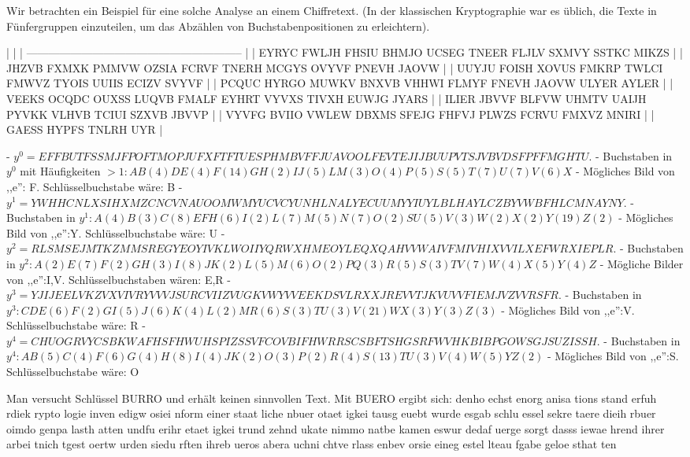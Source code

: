\documentclass[a4paper]{article}
\begin{document}
\begin{multicols}{3}
Wir betrachten ein Beispiel für eine solche Analyse an einem Chiffretext. (In der klassischen Kryptographie war es üblich, die Texte in Fünfergruppen einzuteilen, um das Abzählen von Buchstabenpositionen zu erleichtern).

|                                                             |
| ----------------------------------------------------------- |
| EYRYC FWLJH FHSIU BHMJO UCSEG TNEER FLJLV SXMVY SSTKC MIKZS |
| JHZVB FXMXK PMMVW OZSIA FCRVF TNERH MCGYS OVYVF PNEVH JAOVW |
| UUYJU FOISH XOVUS FMKRP TWLCI FMWVZ TYOIS UUIIS ECIZV SVYVF |
| PCQUC HYRGO MUWKV BNXVB VHHWI FLMYF FNEVH JAOVW ULYER AYLER |
| VEEKS OCQDC OUXSS LUQVB FMALF EYHRT VYVXS TIVXH EUWJG JYARS |
| ILIER JBVVF BLFVW UHMTV UAIJH PYVKK VLHVB TCIUI SZXVB JBVVP |
| VYVFG BVIIO VWLEW DBXMS SFEJG FHFVJ PLWZS FCRVU FMXVZ MNIRI |
| GAESS HYPFS TNLRH UYR                                       |

- $y^0 =EFFBUTFSSMJFPOFTMOPJUFXFTFTUESPHMBVFFJUAVOOLFEVTEJIJBUUPVTSJVBVDSFPFFMGHTU$. 
  - Buchstaben in $y^0$ mit Häufigkeiten $>1:AB(4)DE(4)F(14)GH(2)IJ(5)LM(3)O(4)P(5)S(5)T(7)U(7)V(6)X$
  - Mögliches Bild von ,,e'': F. Schlüsselbuchstabe wäre: B
- $y^1 =YWHHCNLXSIHXMZCNCVNAUOOMWMYUCVCYUNHLNALYECUUMYYIUYLBLHAYLCZBYVWBFHLCMNAYNY$.
  - Buchstaben in $y^1:A(4)B(3)C(8)EFH(6)I(2)L(7)M(5)N(7)O(2)SU(5)V(3)W(2)X(2)Y(19)Z(2)$
  - Mögliches Bild von ,,e'':Y. Schlüsselbuchstabe wäre: U
- $y^2 =RLSMSEJMTKZMMSREGYEOYIVKLWOIIYQRWXHMEOYLEQXQAHVVWAIVFMIVHIXVVILXEFWRXIEPLR$.
  - Buchstaben in $y^2:A(2)E(7)F(2)GH(3)I(8)JK(2)L(5)M(6)O(2)PQ(3)R(5)S(3)TV(7)W(4)X(5)Y(4)Z$
  - Mögliche Bilder von ,,e'':I,V. Schlüsselbuchstaben wären: E,R
- $y^3 =YJIJEELVKZVXVIVRYVVVJSURCVIIZVUGKVWYVVEEKDSVLRXXJREVVTJKVUVVFIEMJVZVVRSFR$.
  - Buchstaben in $y^3 :CDE(6)F(2)GI(5)J(6)K(4)L(2)MR(6)S(3)TU(3)V(21)WX(3)Y(3)Z(3)$
  - Mögliches Bild von ,,e'':V. Schlüsselbuchstabe wäre: R
- $y^4 =CHUOGRVYCSBKWAFHSFHWUHSPIZSSVFCOVBIFHWRRSCSBFTSHGSRFWVHKBIBPGOWSGJSUZISSH$.
  - Buchstaben in $y^4 :AB(5)C(4)F(6)G(4)H(8)I(4)JK(2)O(3)P(2)R(4)S(13)TU(3)V(4)W(5)YZ(2)$
  - Mögliches Bild von ,,e'':S. Schlüsselbuchstabe wäre: O

Man versucht Schlüssel BURRO und erhält keinen sinnvollen Text. Mit BUERO ergibt sich:
denho echst enorg anisa tions stand erfuh rdiek rypto logie
inven edigw osiei nform einer staat liche nbuer otaet igkei
tausg euebt wurde esgab schlu essel sekre taere dieih rbuer
oimdo genpa lasth atten undfu erihr etaet igkei trund zehnd
ukate nimmo natbe kamen eswur dedaf uerge sorgt dasss iewae
hrend ihrer arbei tnich tgest oertw urden siedu rften ihreb
ueros abera uchni chtve rlass enbev orsie eineg estel lteau
fgabe geloe sthat ten


\end{multicols}
\end{document}
